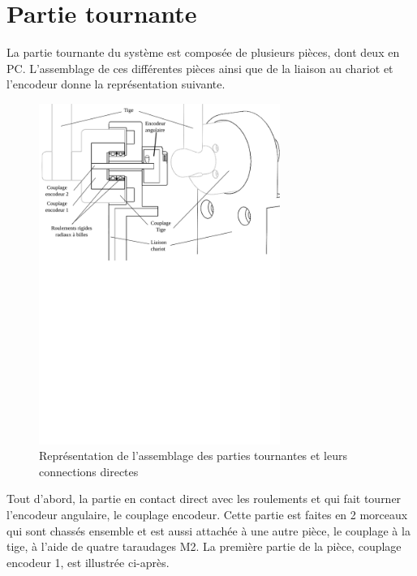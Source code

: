 \section{Partie tournante}\label{sec:PartieTour}
La partie tournante du système est composée de plusieurs pièces, dont deux en \acrshort{PC}. L'assemblage de ces différentes pièces ainsi que de
la liaison au chariot et l'encodeur donne la représentation suivante.

\begin{figure}[H]
    \centering
    \includegraphics[width = 0.7\textwidth]{assets/figures/AssemblagePartieTournante.svg}
    \caption{Représentation de l'assemblage des parties tournantes et leurs connections directes}
    \label{fig:AssPartieTour}
\end{figure}

Tout d'abord, la partie en contact direct avec les roulements et qui fait tourner l'encodeur angulaire, le couplage encodeur. Cette partie est
faites en 2 morceaux qui sont chassés ensemble et est aussi attachée à une autre pièce, le couplage à la tige, à l'aide de quatre taraudages M2.
La première partie de la pièce, couplage encodeur 1, est illustrée ci-après.

